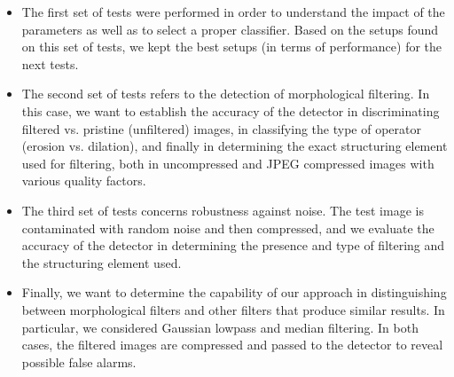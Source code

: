 \documentclass{ieeeaccess}
\begin{document}
\begin{itemize}
	\item The first set of tests were performed in order to understand the impact of the parameters as well as to select a proper classifier. Based on the setups found on this set of tests, we kept the best setups (in terms of performance) for the next tests.
	
	\item The second set of tests refers to the detection of morphological filtering. In this case, we want to establish the accuracy of the detector in discriminating filtered vs. pristine (unfiltered) images, in classifying the type of operator (erosion vs. dilation), and finally in determining the exact structuring element used for filtering, both in uncompressed and JPEG compressed images with various quality factors. 
	
	\item The third set of tests concerns robustness against noise. The test image is contaminated with random noise and then compressed, and we evaluate the accuracy of the detector in determining the presence and type of filtering and the structuring element used.
	
	\item Finally, we want to determine the capability of our approach in distinguishing between morphological filters and other filters that produce similar results. In particular, we considered Gaussian lowpass and median filtering. In both cases, the filtered images are compressed and passed to the detector to reveal possible false alarms.
	
\end{itemize}
\end{document}
